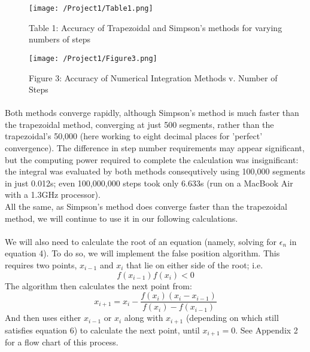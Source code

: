 \documentclass[10pt]{article}
\begin{document}
{\begin{figure}[H]
\texttt{[image: /Project1/Table1.png]}\centering \caption*{\footnotesize Table 1: Accuracy of Trapezoidal and Simpson's methods for varying numbers of steps}
\end{figure}

\begin{figure}[H]
\texttt{[image: /Project1/Figure3.png]}\centering \caption*{\footnotesize Figure 3: Accuracy of Numerical Integration Methods v. Number of Steps}
\end{figure}

\paragraph{}
Both methods converge rapidly, although Simpson's method is much faster than the trapezoidal method, converging at just 500 segments, rather than the trapezoidal's 50,000 (here working to eight decimal places for 'perfect' convergence). The difference in step number requirements may appear significant, but the computing power required to complete the calculation was insignificant: the integral was evaluated by both methods consequtively using 100,000 segments in just 0.012s; even 100,000,000 steps took only 6.633s (run on a MacBook Air with a 1.3GHz processor).\\
All the same, as Simpson's method does converge faster than the trapezoidal method, we will continue to use it in our following calculations.

\paragraph{}
We will also need to calculate the root of an equation (namely, solving for $\epsilon_n$ in equation 4). To do so, we will implement the false position algorithm. This requires two points, $x_{i-1}$ and $x_i$ that lie on either side of the root; i.e. 
\begin{equation} f(x_{i-1})f(x_i) < 0 \end{equation} 
The algorithm then calculates the next point from:
\begin{equation} x_{i+1} = x_i - \frac{f(x_i)(x_i - x_{i-1})}{f(x_i) - f(x_{i-1})} \end{equation}
And then uses either $x_{i-1}$ or $x_i$ along with $x_{i+1}$ (depending on which still satisfies equation 6) to calculate the next point, until $x_{i+1} = 0$. See Appendix 2 for a flow chart of this process.

}
\end{document}
